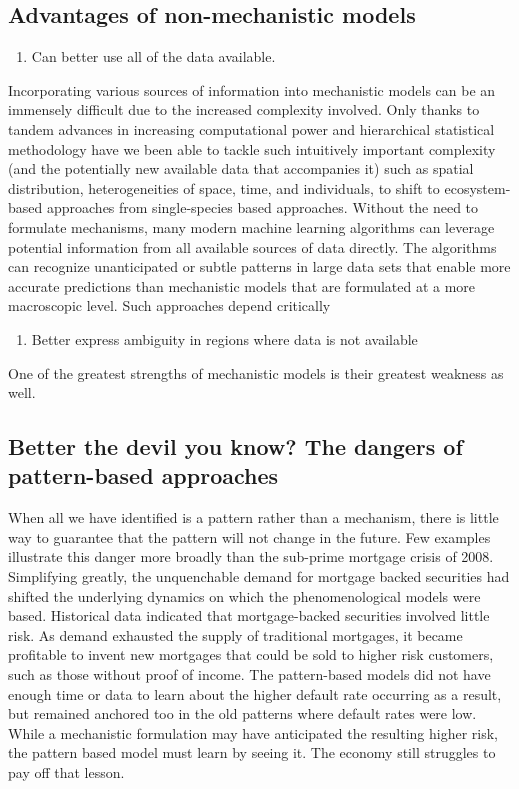 \documentclass[author-year, review]{elsarticle} %
\begin{document}
\subsection{Advantages of non-mechanistic models}

\begin{enumerate}
\def\labelenumi{\arabic{enumi}.}
\itemsep1pt\parskip0pt
\item
  Can better use all of the data available.
\end{enumerate}

Incorporating various sources of information into mechanistic models can
be an immensely difficult due to the increased complexity involved. Only
thanks to tandem advances in increasing computational power and
hierarchical statistical methodology have we been able to tackle such
intuitively important complexity (and the potentially new available data
that accompanies it) such as spatial distribution, heterogeneities of
space, time, and individuals, to shift to ecosystem-based approaches
from single-species based approaches. Without the need to formulate
mechanisms, many modern machine learning algorithms can leverage
potential information from all available sources of data directly. The
algorithms can recognize unanticipated or subtle patterns in large data
sets that enable more accurate predictions than mechanistic models that
are formulated at a more macroscopic level. Such approaches depend
critically

\begin{enumerate}
\def\labelenumi{\arabic{enumi}.}
\setcounter{enumi}{1}
\itemsep1pt\parskip0pt
\item
  Better express ambiguity in regions where data is not available
\end{enumerate}

One of the greatest strengths of mechanistic models is their greatest
weakness as well.

\subsection{Better the devil you know? The dangers of pattern-based
approaches}

When all we have identified is a pattern rather than a mechanism, there
is little way to guarantee that the pattern will not change in the
future. Few examples illustrate this danger more broadly than the
sub-prime mortgage crisis of 2008. Simplifying greatly, the unquenchable
demand for mortgage backed securities had shifted the underlying
dynamics on which the phenomenological models were based. Historical
data indicated that mortgage-backed securities involved little risk. As
demand exhausted the supply of traditional mortgages, it became
profitable to invent new mortgages that could be sold to higher risk
customers, such as those without proof of income. The pattern-based
models did not have enough time or data to learn about the higher
default rate occurring as a result, but remained anchored too in the old
patterns where default rates were low. While a mechanistic formulation
may have anticipated the resulting higher risk, the pattern based model
must learn by seeing it. The economy still struggles to pay off that
lesson.
\end{document}
